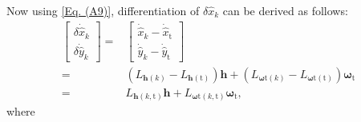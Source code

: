 \documentclass[lettersize,journal]{IEEEtran}
\begin{document}
Now using \eqref{Eq. (A9)}, differentiation of $\delta \hat{x}_{k}$ can be derived as follows:
\begin{align} \label{Eq. (A10)}
    \begin{bmatrix} \delta \dot{\hat{x}}_{k} \\ \delta \dot{\hat{y}}_{k} \end{bmatrix} =& \begin{bmatrix} \dot{\hat{x}}_{k} - \dot{\hat{x}}_{\text{t}} \\ \dot{\hat{y}}_{k} - \dot{\hat{y}}_{\text{t}} \end{bmatrix} \nonumber \\
    =& (L_{\boldsymbol{h}(k)} - L_{\boldsymbol{h}(\text{t})}) \boldsymbol{h} + (L_{\boldsymbol{\omega}\text{t}(k)} - L_{\boldsymbol{\omega}\text{t}(\text{t})}) \boldsymbol{\omega}_{\text{t}} \nonumber \\
    =& L_{\boldsymbol{h}(k,\text{t})} \boldsymbol{h} + L_{\boldsymbol{\omega}\text{t}(k,\text{t})} \boldsymbol{\omega}_{\text{t}},
\end{align}
where
\end{document}

